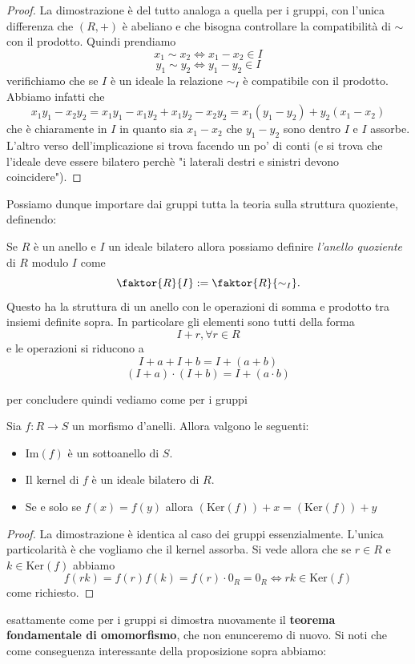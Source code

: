 \documentclass[11pt]{scrartcl}
\newcommand{\Immagine}[1]{\text{Im}\!\left(#1\right)}
\renewcommand{\ker}[1]{\text{Ker}\!\left(#1\right)}
\begin{document}
	\begin{proof}
		La dimostrazione è del tutto analoga a quella per i gruppi, con l'unica differenza che $(R,+)$ è abeliano e che bisogna controllare la compatibilità di $\sim$ con il prodotto. Quindi prendiamo 
		$$x_1\sim x_2 \iff x_1-x_2\in I$$
		$$y_1\sim y_2 \iff y_1-y_2\in I$$
		verifichiamo che se $I$ è un ideale la relazione $\sim_I$ è compatibile con il prodotto. Abbiamo infatti che 
		$$x_1y_1-x_2y_2=x_1y_1-x_1y_2+x_1y_2-x_2y_2=x_1(y_1-y_2)+y_2(x_1-x_2)$$
		che è chiaramente in $I$ in quanto sia $x_1-x_2$ che $y_1-y_2$ sono dentro $I$ e $I$ assorbe. L'altro verso dell'implicazione si trova facendo un po' di conti (e si trova che l'ideale deve essere bilatero perchè "i laterali destri e sinistri devono coincidere").
	\end{proof}
	Possiamo dunque importare dai gruppi tutta la teoria sulla struttura quoziente, definendo:
	\begin{definition}
		Se $R$ è un anello e $I$ un ideale bilatero allora possiamo definire \textit{l'anello quoziente} di $R$ modulo $I$ come
		$$\faktor{R}{I}:=\faktor{R}{\sim_I}.$$
		Questo ha la struttura di un anello con le operazioni di somma e prodotto tra insiemi definite sopra. In particolare gli elementi sono tutti della forma
		$$I+r,\forall r\in R$$
		e le operazioni si riducono a 
		$$I+a+I+b=I+(a+b)$$
		$$\left(I+a\right)\cdot\left(I+b\right)=I+(a\cdot b)$$
	\end{definition}
	per concludere quindi vediamo come per i gruppi
	\begin{proposition}
		Sia $f:R\to S$ un morfismo d'anelli. Allora valgono le seguenti:
		\begin{itemize}
			\item $\Immagine{f}$ è un sottoanello di $S$.
			\item Il kernel di $f$ è un ideale bilatero di $R$.
			\item Se e solo se $f(x)=f(y)$ allora $\left(\ker{f}\right)+x=\left(\ker{f}\right)+y$ 
		\end{itemize}
	\end{proposition}
	\begin{proof}
		La dimostrazione è identica al caso dei gruppi essenzialmente. L'unica particolarità è che vogliamo che il kernel assorba. Si vede allora che se $r\in R$ e $k\in \ker{f}$ abbiamo
		$$f(rk)=f(r)f(k)=f(r)\cdot 0_R=0_R \iff rk\in \ker{f}$$
		come richiesto.
	\end{proof}
	esattamente come per i gruppi si dimostra nuovamente il \textbf{teorema fondamentale di omomorfismo}, che non enunceremo di nuovo. Si noti che come conseguenza interessante della proposizione sopra abbiamo:
\end{document}
